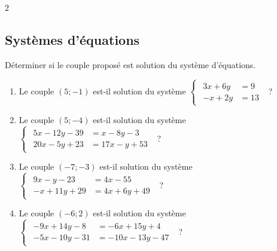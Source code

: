{\begin{multicols}{2}
\begin{Exercice}
\end{Exercice}

\end{multicols}

\newpage

\subsection*{Systèmes d'équations}

\begin{Exercice}
Déterminer si le couple proposé est solution du système d'équations.

\begin{enumerate}[itemsep=1em]
	\item \begin{minipage}[t]{\linewidth} Le couple $(5;-1)$ est-il solution du système $\begin{cases}\begin{aligned}3x+6y &=9\\-x+2y &=13\end{aligned}\end{cases}$ ?\end{minipage}
	\item \begin{minipage}[t]{\linewidth} Le couple $(5;-4)$ est-il solution du système $\begin{cases}\begin{aligned}5x-12y-39 &=x-8y-3\\20x-5y+23 &=17x-y+53\end{aligned}\end{cases}$ ?\end{minipage}
	\item \begin{minipage}[t]{\linewidth} Le couple $(-7;-3)$ est-il solution du système $\begin{cases}\begin{aligned}9x-y-23 &=4x-55\\-x+11y+29 &=4x+6y+49\end{aligned}\end{cases}$ ?\end{minipage}
	\item \begin{minipage}[t]{\linewidth} Le couple $(-6;2)$ est-il solution du système $\begin{cases}\begin{aligned}-9x+14y-8 &=-6x+15y+4\\-5x-10y-31 &=-10x-13y-47\end{aligned}\end{cases}$ ?\end{minipage}
\end{enumerate}
\end{Exercice}

}
